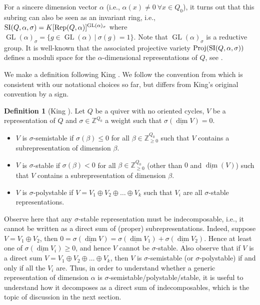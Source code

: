 \documentclass[11pt]{amsart}
\theoremstyle{definition}
\newtheorem{definition}[theorem]{Definition}
\newcommand{\Rep}{{\rm Rep}}
\newcommand{\SI}{{\rm SI}}
\newcommand{\Z}{{\mathbb Z}}
\newcommand{\GL}{\operatorname{GL}}
\begin{document}
For a sincere dimension vector $\alpha$ (i.e., $\alpha(x) \neq 0 \ \forall x \in Q_0$), it turns out that this subring can also be seen as an invariant ring, i.e., $\SI(Q,\alpha,\sigma) = K[\Rep(Q,\alpha)]^{\GL(\alpha)_\sigma}$ where $\GL(\alpha)_\sigma = \{g \in \GL(\alpha)\ |\ \sigma(g) = 1\}$. Note that $\GL(\alpha)_\sigma$ is a reductive group. It is well-known that the associated projective variety ${\rm Proj}(\SI(Q,\alpha,\sigma))$ defines a moduli space for the $\alpha$-dimensional representations of $Q$, see \cite{King}.

We make a definition following King \cite{King}. We follow the convention from \cite{DW-book} which is consistent with our notational choices so far, but differs from King's original convention by a sign.

\begin{definition} [King \cite{King}] \label{crit-king}
Let $Q$ be a quiver with no oriented cycles, $V$ be a representation of $Q$ and $\sigma \in \Z^{Q_0}$ a weight such that $\sigma(\underline\dim V) = 0$.
\begin{itemize}
\item $V$ is $\sigma$-semistable if $\sigma(\beta) \leq 0$ for all $\beta \in \Z_{\geq 0}^{Q_0}$ such that $V$ contains a subrepresentation of dimension $\beta$.
\item $V$ is $\sigma$-stable if $\sigma(\beta) < 0$ for all $\beta \in \Z_{\geq 0}^{Q_0}$ (other than $0$ and $\underline{\dim}(V)$) such that $V$ contains a subrepresentation of dimension $\beta$.
\item $V$ is $\sigma$-polystable if $V = V_1 \oplus V_2 \oplus \dots \oplus V_k$ such that $V_i$ are all $\sigma$-stable representations.
\end{itemize}
\end{definition}

Observe here that any $\sigma$-stable representation must be indecomposable, i.e., it cannot be written as a direct sum of (proper) subrepresentations. Indeed, suppose $V = V_1 \oplus V_2$, then $0 = \sigma(\underline{\dim} V) =  \sigma(\underline{\dim} V_1) + \sigma(\underline{\dim} V_2)$. Hence at least one of $\sigma(\underline{\dim} V_i) \geq 0$, and hence $V$ cannot be $\sigma$-stable. Also observe that if $V$ is a direct sum $V = V_1 \oplus V_2 \oplus \dots \oplus V_k$, then $V$ is $\sigma$-semistable (or $\sigma$-polystable) if and only if all the $V_i$ are. Thus, in order to understand whether a generic representation of dimension $\alpha$ is $\sigma$-semistable/polystable/stable, it is useful to understand how it decomposes as a direct sum of indecomposables, which is the topic of discussion in the next section. 
\end{document}
